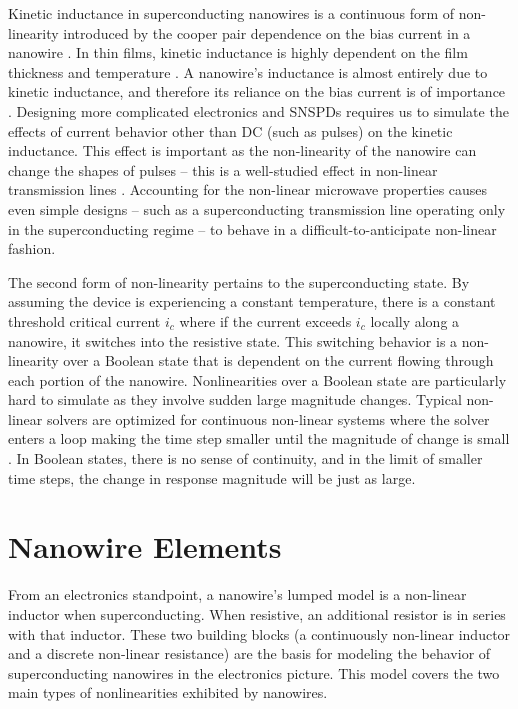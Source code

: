Kinetic inductance in superconducting nanowires is a continuous form of non-linearity introduced by the 
cooper pair dependence on the bias current in a nanowire \cite{inductance_nonlinearity}. In thin films, kinetic inductance is highly dependent on the film thickness
and temperature \cite{dizhu-thesis}. 
A nanowire's inductance is almost entirely due to kinetic inductance, and therefore
its reliance on the bias current is of importance \cite{kinetic_inductance_majority_of_nw}.
Designing more complicated electronics and SNSPDs  requires
us to simulate the effects of current behavior other than DC (such as pulses)
on the kinetic inductance. This effect is important as 
the non-linearity of the nanowire can change the shapes of pulses -- this is a well-studied effect in non-linear transmission lines \cite{nl_tline_reshape}. 
Accounting for the non-linear microwave properties causes even simple designs 
-- such as a superconducting transmission line operating only in the superconducting regime -- to 
behave in a difficult-to-anticipate non-linear fashion. 

The second form of non-linearity pertains to the superconducting state. By assuming the device is
experiencing a constant temperature, there is a constant threshold critical current
$i_c$ where if the current exceeds $i_c$ locally along a nanowire, it switches into the resistive state. This switching behavior is a non-linearity
over a Boolean state that is dependent on the current flowing through each portion of the nanowire.
Nonlinearities over a Boolean state are particularly hard to simulate as they involve sudden large
magnitude changes. Typical non-linear solvers are optimized for continuous non-linear systems where
the solver enters a loop making the time step smaller until the magnitude of change is small \cite{spice-book, hspice}.
In Boolean states, there is no sense of continuity, and in the limit of smaller time steps, the 
change in response magnitude will be just as large. 

\section{Nanowire Elements}

From an electronics standpoint, a nanowire's lumped model is a non-linear inductor when superconducting. When resistive, an additional resistor is in series with that inductor.
These two building blocks (a continuously non-linear inductor and a discrete non-linear
resistance) are the basis for modeling the behavior of superconducting nanowires in
the electronics picture. This model covers the two main types of nonlinearities
exhibited by nanowires.


